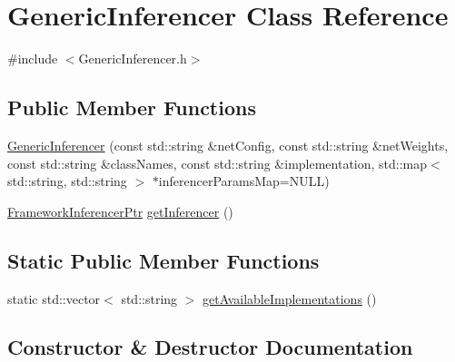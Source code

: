 \hypertarget{class_generic_inferencer}{}\section{Generic\+Inferencer Class Reference}
\label{class_generic_inferencer}


{\ttfamily \#include $<$Generic\+Inferencer.\+h$>$}

\subsection*{Public Member Functions}
\begin{DoxyCompactItemize}
\item 
\hyperlink{class_generic_inferencer_ac27f8f3d177ab05d861ef28dbd0b8a28}{Generic\+Inferencer} (const std\+::string \&net\+Config, const std\+::string \&net\+Weights, const std\+::string \&class\+Names, const std\+::string \&implementation, std\+::map$<$ std\+::string, std\+::string $>$ $\ast$inferencer\+Params\+Map=N\+U\+LL)
\item 
\hyperlink{_framework_inferencer_8h_a7b59ebc4b080d1be0d1a6240703011f2}{Framework\+Inferencer\+Ptr} \hyperlink{class_generic_inferencer_a786e55caa6a7329b8f5d1011372b8942}{get\+Inferencer} ()
\end{DoxyCompactItemize}
\subsection*{Static Public Member Functions}
\begin{DoxyCompactItemize}
\item 
static std\+::vector$<$ std\+::string $>$ \hyperlink{class_generic_inferencer_a40f6285002820780d626e80a2524a494}{get\+Available\+Implementations} ()
\end{DoxyCompactItemize}


\subsection{Constructor \& Destructor Documentation}
\mbox{\label{class_generic_inferencer_ac27f8f3d177ab05d861ef28dbd0b8a28}} 
